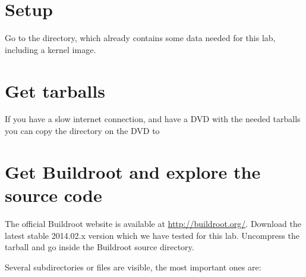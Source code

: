 
\section{Setup}

Go to the  directory,
which already contains some data needed for this lab, including a
kernel image.

\section{Get tarballs}
If you have a slow internet connection, and have a DVD with the needed tarballs
you can copy the  directory on the DVD to 

\section{Get Buildroot and explore the source code}

The official Buildroot website is available at
\url{http://buildroot.org/}. Download the latest stable 2014.02.x
version which we have tested for this lab. Uncompress the tarball
and go inside the Buildroot source directory.

Several subdirectories or files are visible, the most important ones
are:


